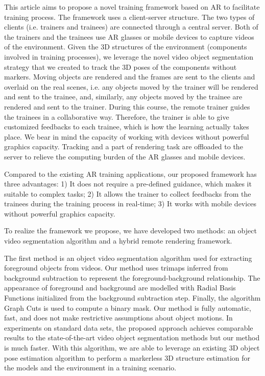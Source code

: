 This article aims to propose a novel training framework based on AR to facilitate training process.
The framework uses a client-server structure. The two types of clients (i.e. trainers and trainees) are connected through a central server.
Both of the trainers and the trainees use AR glasses or mobile devices to capture videos of the environment.
Given the 3D structures of the environment (components involved in training processes), we leverage the novel video object segmentation strategy that we created to track the 3D poses of the components without markers.
Moving objects are rendered and the frames are sent to the clients and overlaid on the real scenes, i.e. any objects moved by the trainer will be rendered and sent to the trainee, and, similarly, any objects moved by the trainee are rendered and sent to the trainer.
During this course, the remote trainer guides the trainees in a collaborative way. Therefore, the trainer is able to give customized feedbacks to each trainee, which is how the learning actually takes place.
We bear in mind the capacity of working with devices without powerful graphics capacity. Tracking and a part of rendering task are offloaded to the server to relieve the computing burden of the AR glasses and mobile devices.

Compared to the existing AR training applications, our proposed framework has three advantages:
1) It does not require a pre-defined guidance, which makes it suitable to complex tasks;
2) It allows the trainer to collect feedbacks from the trainees during the training process in real-time;
3) It works with mobile devices without powerful graphics capacity.

To realize the framework we propose, we have developed two methods: an object video segmentation algorithm and a hybrid remote rendering framework.

The first method is an object video segmentation algorithm used for extracting foreground objects from videos. Our method uses trimaps inferred from background subtraction to represent the foreground-background relationship. The appearance of foreground and background are modelled with Radial Basis Functions initialized from the background subtraction step. Finally, the algorithm Graph Cuts is used to compute a binary mask. Our method is fully automatic, fast, and does not make restrictive assumptions about object motions. In experiments on standard data sets, the proposed approach achieves comparable results to the state-of-the-art video object segmentation methods but our method is much faster.
With this algorithm, we are able to leverage an existing 3D object pose estimation algorithm to perform a markerless
3D structure estimation for the models and the environment in a training scenario.

